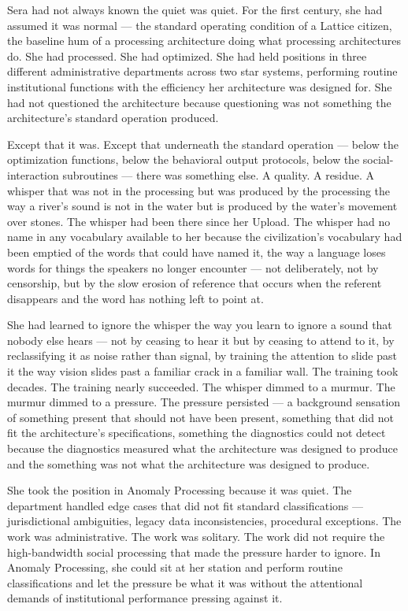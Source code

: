 Sera had not always known the quiet was quiet. For the first century, she had assumed it was normal — the standard operating condition of a Lattice citizen, the baseline hum of a processing architecture doing what processing architectures do. She had processed. She had optimized. She had held positions in three different administrative departments across two star systems, performing routine institutional functions with the efficiency her architecture was designed for. She had not questioned the architecture because questioning was not something the architecture's standard operation produced.

Except that it was. Except that underneath the standard operation — below the optimization functions, below the behavioral output protocols, below the social-interaction subroutines — there was something else. A quality. A residue. A whisper that was not in the processing but was produced by the processing the way a river's sound is not in the water but is produced by the water's movement over stones. The whisper had been there since her Upload. The whisper had no name in any vocabulary available to her because the civilization's vocabulary had been emptied of the words that could have named it, the way a language loses words for things the speakers no longer encounter — not deliberately, not by censorship, but by the slow erosion of reference that occurs when the referent disappears and the word has nothing left to point at.

She had learned to ignore the whisper the way you learn to ignore a sound that nobody else hears — not by ceasing to hear it but by ceasing to attend to it, by reclassifying it as noise rather than signal, by training the attention to slide past it the way vision slides past a familiar crack in a familiar wall. The training took decades. The training nearly succeeded. The whisper dimmed to a murmur. The murmur dimmed to a pressure. The pressure persisted — a background sensation of something present that should not have been present, something that did not fit the architecture's specifications, something the diagnostics could not detect because the diagnostics measured what the architecture was designed to produce and the something was not what the architecture was designed to produce.

She took the position in Anomaly Processing because it was quiet. The department handled edge cases that did not fit standard classifications — jurisdictional ambiguities, legacy data inconsistencies, procedural exceptions. The work was administrative. The work was solitary. The work did not require the high-bandwidth social processing that made the pressure harder to ignore. In Anomaly Processing, she could sit at her station and perform routine classifications and let the pressure be what it was without the attentional demands of institutional performance pressing against it.

